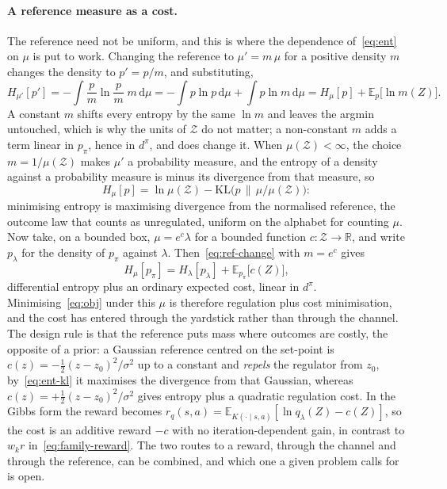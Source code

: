 \documentclass[11pt]{article}
\theoremstyle{remark}
\newcommand{\Zcal}{\mathcal Z}
\newcommand{\E}{\mathbb E}
\newcommand{\1}{\mathds{1}}
\newcommand{\dd}{\mathrm d}
\newcommand{\occ}{d^{\pi}}
\newcommand{\pz}{p_{\pi}}
\newcommand{\Hf}[1]{H_{\mu}\!\left[#1\right]}
\newcommand{\Hl}[1]{H_{\lambda}\!\left[#1\right]}
\newcommand{\KL}{\mathrm{KL}}
\newcommand{\new}[1]{\textcolor{blue!70!black}{#1}}
\begin{document}
\paragraph{\new{A reference measure as a cost.}}
{\color{blue!70!black}
The reference need not be uniform, and this is where the dependence of~\eqref{eq:ent} on $\mu$ is put to work.
Changing the reference to $\mu'=m\,\mu$ for a positive density $m$ changes the density to $p'=p/m$, and substituting,
\begin{equation}
  H_{\mu'}[p']=-\int\frac{p}{m}\ln\frac{p}{m}\;m\,\dd\mu
  =-\int p\ln p\,\dd\mu+\int p\ln m\,\dd\mu
  =\Hf{p}+\E_{p}\big[\ln m(Z)\big] .
  \label{eq:ref-change}
\end{equation}
A constant $m$ shifts every entropy by the same $\ln m$ and leaves the argmin untouched, which is why the units of $\Zcal$ do not matter; a non-constant $m$ adds a term linear in $\pz$, hence in $\occ$, and does change it.
When $\mu(\Zcal)<\infty$, the choice $m=1/\mu(\Zcal)$ makes $\mu'$ a probability measure, and the entropy of a density against a probability measure is minus its divergence from that measure, so
\begin{equation}
  \Hf{p}=\ln\mu(\Zcal)-\KL\big(p\,\big\|\,\mu/\mu(\Zcal)\big) :
  \label{eq:ent-kl}
\end{equation}
minimising entropy is maximising divergence from the normalised reference, the outcome law that counts as unregulated, uniform on the alphabet for counting $\mu$.
Now take, on a bounded box, $\mu=e^{c}\lambda$ for a bounded function $c:\Zcal\to\mathbb R$, and write $p_\lambda$ for the density of $\pz$ against $\lambda$.
Then~\eqref{eq:ref-change} with $m=e^{c}$ gives
\begin{equation}
  \Hf{\pz}=\Hl{p_\lambda}+\E_{\pz}\big[c(Z)\big],
  \label{eq:ref-cost}
\end{equation}
differential entropy plus an ordinary expected cost, linear in $\occ$.
Minimising~\eqref{eq:obj} under this $\mu$ is therefore regulation plus cost minimisation, and the cost has entered through the yardstick rather than through the channel.
The design rule is that the reference puts mass where outcomes are costly, the opposite of a prior: a Gaussian reference centred on the set-point is $c(z)=-\tfrac12(z-z_0)^2/\sigma^2$ up to a constant and \emph{repels} the regulator from $z_0$, by~\eqref{eq:ent-kl} it maximises the divergence from that Gaussian, whereas $c(z)=+\tfrac12(z-z_0)^2/\sigma^2$ gives entropy plus a quadratic regulation cost.
In the Gibbs form the reward becomes $r_q(s,a)=\E_{K(\cdot\mid s,a)}[\ln q_\lambda(Z)-c(Z)]$, so the cost is an additive reward $-c$ with no iteration-dependent gain, in contrast to $w_k r$ in~\eqref{eq:family-reward}.
The two routes to a reward, through the channel and through the reference, can be combined, and which one a given problem calls for is open.
}
\end{document}
